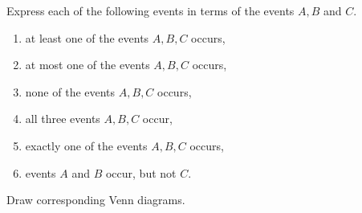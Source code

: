 \documentclass{article}
\begin{document}
    \newpage
    \begin{problem}
        Express each of the following events in terms of the events $A, B$ and $C$. 
        \begin{enumerate}[label=(\alph*)]
            \item at least one of the events $A, B, C$ occurs,
            \item at most one of the events $A, B, C$ occurs, 
            \item none of the events $A, B, C$ occurs,
            \item all three events $A, B, C$ occur,
            \item exactly one of the events $A, B, C$ occurs,
            \item events $A$ and $B$ occur, but not $C$.
        \end{enumerate}
        Draw corresponding Venn diagrams. 
    \end{problem}
    
\end{document}
